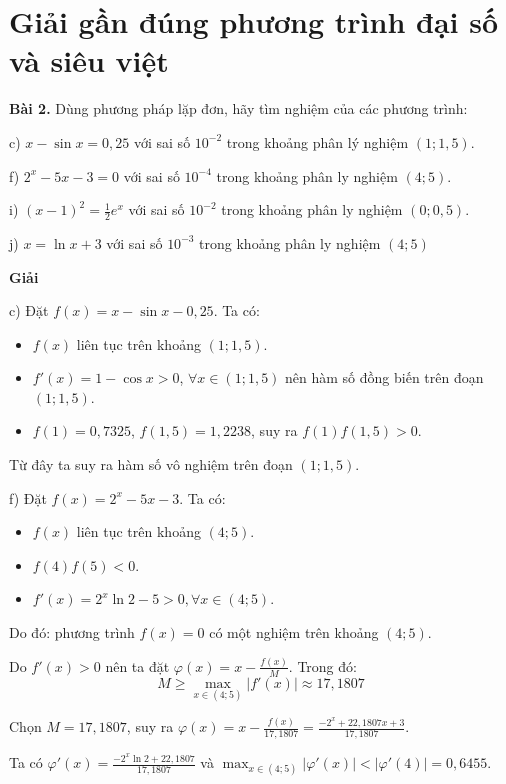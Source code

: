 \chapter{Giải gần đúng phương trình đại số và siêu việt}

\textbf{Bài 2.} Dùng phương pháp lặp đơn, hãy tìm nghiệm của các phương trình:\par
c) $x-\sin{x}=0,25$ với sai số $10^{-2}$ trong khoảng phân lý nghiệm $(1;1,5)$.\par
f) $2^{x}-5x-3=0$ với sai số $10^{-4}$ trong khoảng phân ly nghiệm $(4;5)$.\par
i) $(x-1)^2=\frac{1}{2}e^x$ với sai số $10^{-2}$ trong khoảng phân ly nghiệm $(0;0,5)$.\par
j) $x=\ln x+3$ với sai số $10^{-3}$ trong khoảng phân ly nghiệm $(4;5)$

\textbf{Giải}

c) Đặt $f(x)=x-\sin{x}-0,25 $. Ta có:
\begin{itemize}
	\item $f(x) $ liên tục trên khoảng $\left(1;1,5\right) $.
	\item $f'(x)=1-\cos{x}>0$, $\forall x\in \left(1;1,5\right) $ nên hàm số đồng biến trên đoạn $\left(1;1,5\right)$.
	\item $f\left(1\right)= 0,7325$, $f\left(1,5\right)=1,2238 $, suy ra $f\left(1\right)f\left(1,5\right)>0$.
\end{itemize}
Từ đây ta suy ra hàm số vô nghiệm trên đoạn $(1;1,5)$.\par

f) Đặt $f(x)=2^{x}-5x-3 $. Ta có:
\begin{itemize}
	\item $f(x) $ liên tục trên khoảng $\left(4;5\right) $.
	\item $f\left(4\right)f\left(5\right)<0 $.
	\item $f'(x)=2^{x}\ln{2}-5 > 0, \forall x \in \left(4;5\right) $.
\end{itemize}

Do đó: phương trình $f(x)=0  $ có một nghiệm trên khoảng $\left(4;5\right) $.\par

Do $f'(x)>0 $ nên ta đặt $\varphi(x)=x-\frac{f(x)}{M}$.
Trong đó:
$$M\geq \underset{x\in \left(4;5\right) }\max\left| f'(x) \right| \approx 17,1807$$

Chọn $M=17,1807 $, suy ra $\varphi(x) =x-\frac{f(x) }{17,1807} = \frac{-2^{x}+22,1807x + 3}{17,1807}$.\par
Ta có $\varphi ' (x) = \frac{-2^{x}\ln{2}+22,1807}{17,1807}$ và $\max_{x\in(4;5)}\left| \varphi ' (x) \right| < \left| \varphi ' \left(4\right) \right| = 0,6455 $.\par

